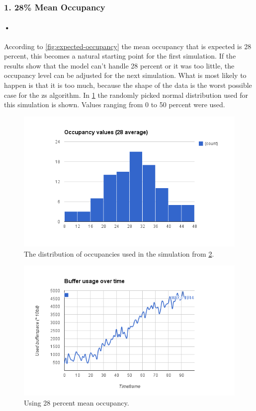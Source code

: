 \documentclass[a4paper, 12pt]{report}
\begin{document}
\subsubsection{1. 28\% Mean Occupancy}

\paragraph{•}
According to \ref{fig:expected-occupancy} the mean occupancy that is expected is 28 percent, this becomes a natural starting point for the first simulation.
If the results show that the model can't handle 28 percent or it was too little, the occupancy level can be adjusted for the next simulation.
What is most likely to happen is that it is too much, because the shape of the data is the worst possible case for the \gls{zs} algorithm. 
In \ref{fig:28-dist} the randomly picked normal distribution used for this simulation is shown.
Values ranging from 0 to 50 percent were used.

\begin{figure}[h!]
	\centering
		\includegraphics[width=1.0\textwidth]{images/occupancy-28.png}
		\caption{The distribution of occupancies used in the simulation from \ref{fig:28-occ}.}
		\label{fig:28-dist}
\end{figure}

\begin{figure}[h!]
	\centering
		\includegraphics[width=1.0\textwidth]{images/mean-28.png}
		\caption{Using 28 percent mean occupancy.}
		\label{fig:28-occ}
\end{figure}
\end{document}
